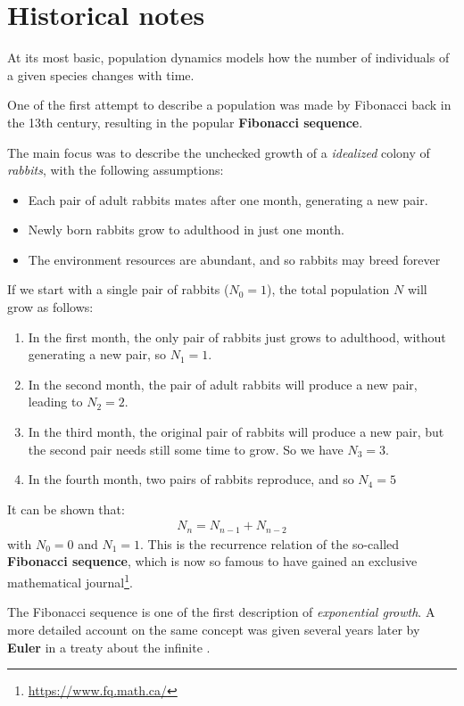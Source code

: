 \documentclass[../../main.tex]{subfiles}
\begin{document}
\section{Historical notes}
At its most basic, population dynamics models how the number of individuals of a given species changes with time.

One of the first attempt to describe a population was made by Fibonacci back in the 13th century, resulting in the popular \textbf{Fibonacci sequence}.

The main focus was to describe the unchecked growth of a \textit{idealized} colony of \textit{rabbits}, with the following assumptions:
\begin{itemize}
    \item Each pair of adult rabbits mates after one month, generating a new pair.
    \item Newly born rabbits grow to adulthood in just one month.
    \item The environment resources are abundant, and so rabbits may breed forever
\end{itemize}
If we start with a single pair of rabbits ($N_0=1$), the total population $N$ will grow as follows:
\begin{enumerate}
    \item In the first month, the only pair of rabbits just grows to adulthood, without generating a new pair, so $N_1=1$.
    \item In the second month, the pair of adult rabbits will produce a new pair, leading to $N_2=2$.
    \item In the third month, the original pair of rabbits will produce a new pair, but the second pair needs still some time to grow. So we have $N_3 = 3$.
    \item In the fourth month, two pairs of rabbits reproduce, and so $N_4 = 5$
\end{enumerate}
It can be shown that:
\begin{align*}
    N_n = N_{n-1} + N_{n-2}
\end{align*}
with $N_0 = 0$ and $N_1 = 1$. This is the recurrence relation of the so-called \textbf{Fibonacci sequence}, which is now so famous to have gained an exclusive mathematical journal\footnote{\url{https://www.fq.math.ca/}}.

\medskip

The Fibonacci sequence is one of the first description of \textit{exponential growth}. A more detailed account on the same concept was given several years later by \textbf{Euler} in a treaty about the infinite \cite{euler_population}.
\end{document}
